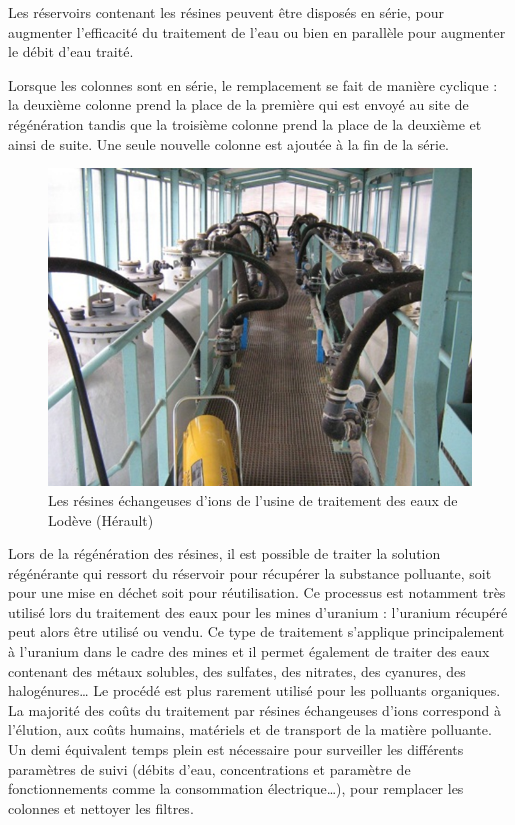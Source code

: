 \documentclass{article}
\begin{document}
Les réservoirs contenant les résines peuvent être disposés en série, pour augmenter l’efficacité du traitement de l’eau ou bien en parallèle pour augmenter le débit d’eau traité.

Lorsque les colonnes sont en série, le remplacement se fait de manière cyclique : la deuxième colonne prend la place de la première qui est envoyé au site de régénération tandis que la troisième colonne prend la place de la deuxième et ainsi de suite. Une seule nouvelle colonne est ajoutée à la fin de la série. %

\begin{figure}[H]
\centering
\includegraphics[width=0.9\linewidth]{III_A_3.png}
\caption{Les résines échangeuses d'ions de l'usine de traitement des eaux de Lodève (Hérault)}
\label{fig:usine_traitement_resines}
\end{figure}

Lors de la régénération des résines, il est possible de traiter la solution régénérante qui ressort du réservoir pour récupérer la substance polluante, soit pour une mise en déchet soit pour réutilisation. Ce processus est notamment très utilisé lors du traitement des eaux pour les mines d’uranium : l’uranium récupéré peut alors être utilisé ou vendu.
Ce type de traitement s’applique principalement à l’uranium dans le cadre des mines et il permet également de traiter des eaux contenant des métaux solubles, des sulfates, des nitrates, des cyanures, des halogénures… Le procédé est plus rarement utilisé pour les polluants organiques.
La majorité des coûts du traitement par résines échangeuses d’ions correspond à l’élution, aux coûts humains, matériels et de transport de la matière polluante.
Un demi équivalent temps plein est nécessaire pour surveiller les différents paramètres de suivi (débits d’eau, concentrations et paramètre de fonctionnements comme la consommation électrique…), pour remplacer les colonnes et nettoyer les filtres.
\end{document}
